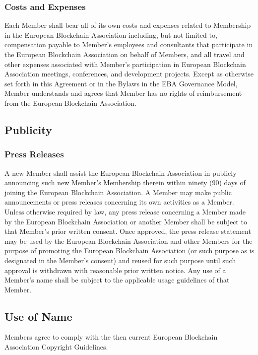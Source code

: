 \documentclass{article}
\begin{document}
\subsubsection{Costs and Expenses}

Each Member shall bear all of its own costs and expenses related to Membership in the European Blockchain Association including, but not limited to, compensation payable to Member’s employees and consultants that participate in the European Blockchain Association on behalf of Members, and all travel and other expenses associated with Member’s participation in European Blockchain Association meetings, conferences, and development projects.
 Except as otherwise set forth in this Agreement or in the Bylaws in the EBA Governance Model, Member understands and agrees that Member has no rights of reimbursement from the European Blockchain Association.

\subsection{Publicity}

\subsubsection{Press Releases}

A new Member shall assist the European Blockchain Association in publicly announcing such new Member’s Membership therein within ninety (90) days of joining the European Blockchain Association. 
A Member may make public announcements or press releases concerning its own activities as a Member.
 Unless otherwise required by law, any press release concerning a Member made by the European Blockchain Association or another Member shall be subject to that Member's prior written consent. 
 Once approved, the press release statement may be used by the European Blockchain Association and other Members for the purpose of promoting the European Blockchain Association (or such purpose as is designated in the Member's consent) and reused for such purpose until such approval is withdrawn with reasonable prior written notice. 
 Any use of a Member's name shall be subject to the applicable usage guidelines of that Member.

\subsection{Use of Name}

Members agree to comply with the then current European Blockchain Association Copyright Guidelines.
\end{document}
